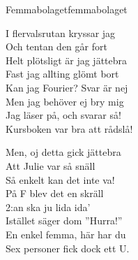 \begin{song}{Femmabolaget}{femmabolaget}
\begin{vers}
I flervalsrutan kryssar jag\\
Och tentan den går fort\\
Helt plötsligt är jag jättebra\\
Fast jag allting glömt bort\\
Kan jag Fourier? Svar är nej\\
Men jag behöver ej bry mig\\
Jag läser på, och svarar så!\\
Kursboken var bra att rådslå!\\
\end{vers}
\begin{vers}
Men, oj detta gick jättebra\\
Att Julie var så snäll\\
Så enkelt kan det inte va!\\
På F blev det en skräll\\
2:an ska ju lida ida'\\
Istället säger dom ''Hurra!''\\
En enkel femma, här har du\\
Sex personer fick dock ett U.\\
\end{vers}
\end{song}